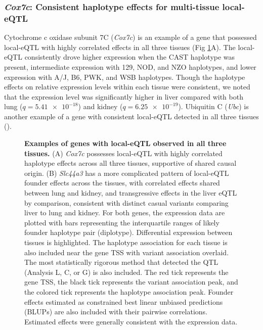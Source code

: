 \documentclass[10pt,letterpaper]{article}
\begin{document}
\subsubsection*{\textit{Cox7c}: Consistent haplotype effects for multi-tissue local-eQTL}
Cytochrome c oxidase subunit 7C (\textit{Cox7c}) is an example of a gene that possessed local-eQTL with highly correlated effects in all three tissues (Fig \ref{fig:correlated_local_eqtl}A).
The local-eQTL consistently drove higher expression when the CAST haplotype was present, intermediate expression with 129, NOD, and NZO haplotypes, and lower expression with A/J, B6, PWK, and WSB haplotypes. Though the haplotype effects on relative expression levels within each tissue were consistent, we noted that the expression level was significantly higher in liver compared with both lung ($q = \num{5.41e-18}$) and kidney ($q = \num{6.25e-19}$). Ubiquitin C (\textit{Ubc}) is another example of a gene with consistent local-eQTL detected in all three tissues ().

\begin{figure}[h!]
\caption{\textbf{Examples of genes with local-eQTL observed in all three tissues.} 
(A) \textit{Cox7c} possesses local-eQTL with highly correlated haplotype effects across all three tissues, supportive of shared causal origin. (B) \textit{Slc44a3} has a more complicated pattern of local-eQTL founder effects across the tissues, with correlated effects shared between lung and kidney, and transgressive effects in the liver eQTL by comparison, consistent with distinct casual variants comparing liver to lung and kidney. For both genes, the expression data are plotted with bars representing the interquartile ranges of likely founder haplotype pair (diplotype). Differential expression between tissues is highlighted. The haplotype association for each tissue is also included near the gene TSS with variant association overlaid. The most statistically rigorous method that detected the QTL (Analysis L, C, or G) is also included. The red tick represents the gene TSS, the black tick represents the variant association peak, and the colored tick represents the haplotype association peak. Founder effects estimated as constrained best linear unbiased predictions (BLUPs) are also included with their pairwise correlations. Estimated effects were generally consistent with the expression data.
\label{fig:correlated_local_eqtl}}
\end{figure}
\end{document}
